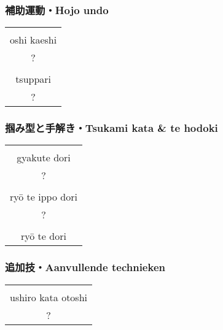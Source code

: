 \subsubsection{補助運動・Hojo undo}
\begin{table}[H]
\begin{center}
\begin{tabular}{c}
    \ruby{}{}\ruby{}{}\\
    oshi kaeshi\\
    ?\\
    \hline
    \ruby{}{}\\
    tsuppari\\
    ?
\end{tabular}
\end{center}
\label{kyuu_5_hojo_undo}
\end{table}

\subsubsection{掴み型と手解き・Tsukami kata \& te hodoki}
\begin{table}[H]
\begin{center}
\begin{tabular}{c}
    \ruby{}{}\ruby{}{}\\
    gyakute dori\\
    ?\\
    \hline
    \ruby{}{}\\
    ry\={o} te ippo dori\\
    ?\\
    \hline
    \ruby{}{}\\
    ry\={o} te dori
\end{tabular}
\end{center}
\label{kyuu_5_te_hodoki}
\end{table}

\subsubsection{追加技・Aanvullende technieken}
\begin{table}[H]
\begin{center}
\begin{tabular}{c}
    \ruby{}{}\ruby{}{}\\
    ushiro kata otoshi\\
    ?
\end{tabular}
\end{center}
\label{kyuu_5_additional}
\end{table}

